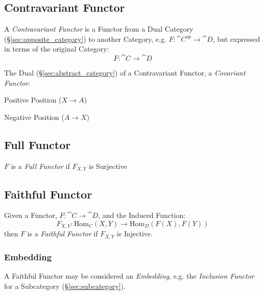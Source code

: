 \subsection{Contravariant Functor} \label{sec:contravariant_functor}

A \emph{Contravariant Functor} is a Functor from a Dual Category
(\S\ref{sec:opposite_category}) to another Category, e.g. $F :
\cat{C^{op}} \rightarrow \cat{D}$, but expressed in terms of the
original Category:
\[
  \overline{F} : \cat{C} \rightarrow \cat{D}
\]

The Dual (\S\ref{sec:abstract_category}) of a Contravariant
Functor, a \emph{Covariant Functor}.

Positive Position ($X \rightarrow A$)

Negative Position ($A \rightarrow X$)



\subsection{Full Functor}\label{sec:full_functor}

$F$ is a \emph{Full Functor} if $F_{X,Y}$ is Surjective



\subsection{Faithful Functor}\label{sec:faithful_functor}

Given a Functor, $F : \cat{C} \rightarrow \cat{D}$, and the
Induced Function:
\[
  F_{X,Y} : \mathrm{Hom}_C(X,Y) \rightarrow \mathrm{Hom}_D(F(X),F(Y))
\]
then $F$ is a \emph{Faithful Functor} if $F_{X,Y}$ is Injective.



\subsubsection{Embedding}\label{sec:category_embedding}

A Faithful Functor may be considered an \emph{Embedding}, e.g. the
\emph{Inclusion Functor} for a Subcategory
(\S\ref{sec:subcategory}).

